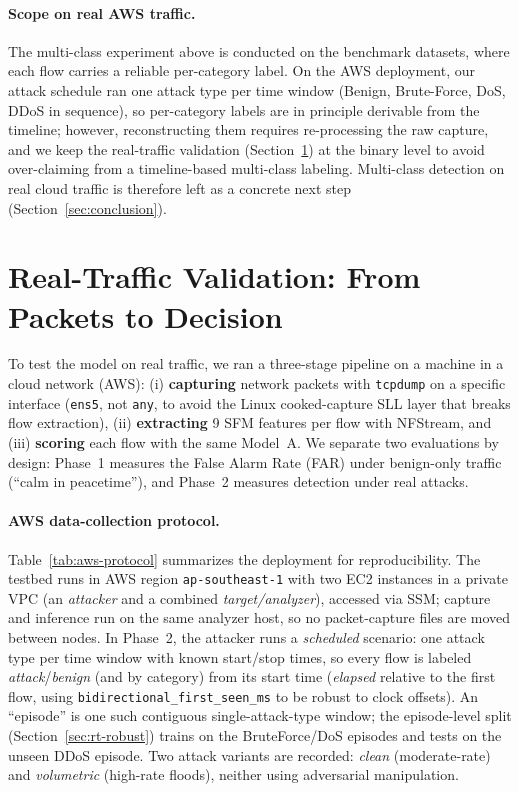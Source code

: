 \documentclass[preprint,12pt,authoryear]{elsarticle}
\begin{document}
\paragraph{Scope on real AWS traffic.} The multi-class experiment above is
conducted on the benchmark datasets, where each flow carries a reliable
per-category label. On the AWS deployment, our attack schedule ran one attack type
per time window (Benign, Brute-Force, DoS, DDoS in sequence), so per-category labels
are in principle derivable from the timeline; however, reconstructing them requires
re-processing the raw capture, and we keep the real-traffic validation
(Section~\ref{sec:realtraffic}) at the binary level to avoid over-claiming from a
timeline-based multi-class labeling. Multi-class detection on real cloud traffic is
therefore left as a concrete next step (Section~\ref{sec:conclusion}).

\section{Real-Traffic Validation: From Packets to Decision}
\label{sec:realtraffic}

To test the model on real traffic, we ran a three-stage pipeline on a machine in
a cloud network (AWS): (i) \textbf{capturing} network packets with \texttt{tcpdump}
on a specific interface (\texttt{ens5}, not \texttt{any}, to avoid the Linux
cooked-capture SLL layer that breaks flow extraction), (ii) \textbf{extracting} 9
SFM features per flow with NFStream, and (iii) \textbf{scoring} each flow with the
same Model~A. We separate two evaluations by design: Phase~1 measures the False
Alarm Rate (FAR) under benign-only traffic (``calm in peacetime''), and Phase~2
measures detection under real attacks.

\paragraph{AWS data-collection protocol.} Table~\ref{tab:aws-protocol} summarizes
the deployment for reproducibility. The testbed runs in AWS region
\texttt{ap-southeast-1} with two EC2 instances in a private VPC (an
\emph{attacker} and a combined \emph{target/analyzer}), accessed via SSM; capture
and inference run on the same analyzer host, so no packet-capture files are moved
between nodes. In Phase~2, the attacker runs a \emph{scheduled} scenario: one
attack type per time window with known start/stop times, so every flow is labeled
\emph{attack}/\emph{benign} (and by category) from its start time (\emph{elapsed}
relative to the first flow, using \texttt{bidirectional\_first\_seen\_ms} to be
robust to clock offsets). An ``episode'' is one such contiguous single-attack-type
window; the episode-level split (Section~\ref{sec:rt-robust}) trains on the
BruteForce/DoS episodes and tests on the unseen DDoS episode. Two attack variants
are recorded: \emph{clean} (moderate-rate) and \emph{volumetric} (high-rate
floods), neither using adversarial manipulation.
\end{document}
